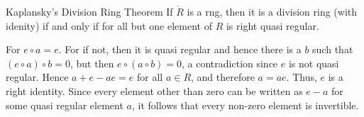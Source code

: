\documentclass{article}                                                        %
\begin{document}
                \begin{ftheorem}{Kaplansky's Division Ring Theorem}
                    If $\ring{R}$ is a rng, then it is a division ring (with
                    idenity) if and only if for all but one element of $R$ is
                    right quasi regular.
                \end{ftheorem}
                \begin{bproof}
                    For $e\circ{a}=e$. For if not, then it is quasi regular
                    and hence there is a $b$ such that $(e\circ{a})\circ{b}=0$,
                    but then $e\circ(a\circ{b})=0$, a contradiction since $e$ is
                    not quasi regular. Hence $a+e-ae=e$ for all $a\in{R}$,
                    and therefore $a=ae$. Thus, $e$ is a right identity. Since
                    every element other than zero can be written as $e-a$ for
                    some quasi regular element $a$, it follows that every
                    non-zero element is invertible.
                \end{bproof}
\end{document}
